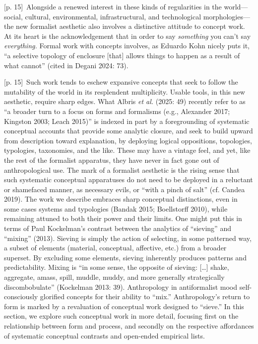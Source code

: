 \documentclass[10pt,a4paper]{article}
\begin{document}
{\scriptsize\color{gray} [p. 15]}\ Alongside a renewed interest in these kinds of regularities in the world—social, cultural, environmental, infrastructural, and technological morphologies—the new formalist aesthetic also involves a distinctive attitude to concept work. At its heart is the acknowledgement that in order to say \textit{something} you can’t say \textit{everything.} Formal work with concepts involves, as Eduardo Kohn nicely puts it, “a selective topology of enclosure [that] allows things to happen as a result of what cannot” (cited in Degani 2024: 73).\par
{\scriptsize\color{gray} [p. 15]}\ Such work tends to eschew expansive concepts that seek to follow the mutability of the world in its resplendent multiplicity. Usable tools, in this new aesthetic, require sharp edges. What Albris \textit{et al.} (2025: 49) recently refer to as “a broader turn to a focus on forms and formalisms (e.g., Alexander 2017; Kingston 2003; Leach 2015)” is indexed in part by a foregrounding of systematic conceptual accounts that provide some analytic closure, and seek to build upward from description toward explanation, by deploying logical oppositions, topologies, typologies, taxonomies, and the like. These may have a vintage feel, and yet, like the rest of the formalist apparatus, they have never in fact gone out of anthropological use. The mark of a formalist aesthetic is the rising sense that such systematic conceptual apparatuses do not need to be deployed in a reluctant or shamefaced manner, as necessary evils, or “with a pinch of salt” (cf. Candea 2019). The work we describe embraces sharp conceptual distinctions, even in some cases systems and typologies (Bandak 2015; Boellstorff 2010), while remaining attuned to both their power and their limits. One might put this in terms of Paul Kockelman’s contrast between the analytics of “sieving” and “mixing” (2013). Sieving is simply the action of selecting, in some patterned way, a subset of elements (material, conceptual, affective, etc.) from a broader superset. By excluding some elements, sieving inherently produces patterns and predictability. Mixing is “in some sense, the opposite of sieving: […] shake, aggregate, amass, spill, muddle, muddy, and more generally strategically discombobulate” (Kockelman 2013: 39). Anthropology in antiformalist mood self-consciously glorified concepts for their ability to “mix.” Anthropology’s return to form is marked by a revaluation of conceptual work designed to “sieve.” In this section, we explore such conceptual work in more detail, focusing first on the relationship between form and process, and secondly on the respective affordances of systematic conceptual contrasts and open-ended empirical lists.\par
\end{document}
